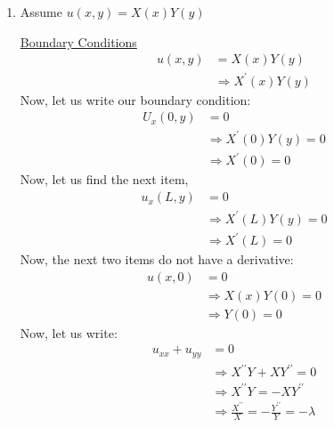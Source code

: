 \documentclass{article}
\begin{document}
\begin{enumerate}
  \item Assume $u(x, y) = X(x)Y(y)$

  \underline{Boundary Conditions}
  \begin{align}
    u(x, y) & = X(x) Y(y)\\
    & \Rightarrow X^\prime(x)Y(y)
  \end{align}
  Now, let us write our boundary condition:
  \begin{align}
    U_x(0, y) & = 0\\
    & \Rightarrow X^\prime(0)Y(y) = 0\\
    & \Rightarrow X^\prime(0) = 0
  \end{align}
  Now, let us find the next item,
  \begin{align}
    u_x(L, y) & = 0\\
    & \Rightarrow X^\prime(L)Y(y) = 0\\
    & \Rightarrow X^\prime(L) = 0
  \end{align}
  Now, the next two items do not have a derivative:
  \begin{align}
    u(x, 0) & = 0\\
    & \Rightarrow X(x)Y(0) = 0\\
    & \Rightarrow Y(0) = 0
  \end{align}
  Now, let us write:
  \begin{align}
    u_{xx} + u_{yy} & = 0\\
    & \Rightarrow X^{\prime\prime}Y + XY^{\prime\prime} = 0\\
    & \Rightarrow X^{\prime\prime}Y = - XY^{\prime\prime}\\
    & \Rightarrow \frac{X^{\prime\prime}}{X} = - \frac{Y^{\prime\prime}}{Y} = -\lambda
  \end{align}


\end{enumerate}
\end{document}
